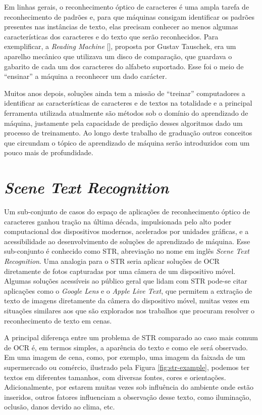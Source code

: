 Em linhas gerais, o reconhecimento óptico de caracteres é uma ampla tarefa de reconhecimento de padrões e, para que máquinas consigam identificar 
os padrões presentes nas instâncias de texto, elas precisam conhecer ao menos algumas características dos caracteres e do texto que serão 
reconhecidos. Para exemplificar, a \textit{Reading Machine} [], proposta por Gustav Tauschek, era um aparelho mecânico que utilizava um disco de 
comparação, que guardava o gabarito de cada um dos caracteres do alfabeto suportado. Esse foi o meio de “ensinar” a máquina a reconhecer um dado carácter.

Muitos anos depois, soluções ainda tem a missão de “treinar” computadores a identificar as características de caracteres e de textos na totalidade 
e a principal ferramenta utilizada atualmente são métodos sob o domínio do aprendizado de máquina, justamente pela capacidade de predição desses 
algoritmos dado um processo de treinamento. Ao longo deste trabalho de graduação outros conceitos que circundam o tópico de aprendizado de máquina 
serão introduzidos com um pouco mais de profundidade.

\section{\textit{Scene Text Recognition}}

Um sub-conjunto de casos do espaço de aplicações de reconhecimento óptico de caracteres ganhou tração na última década, impulsionada pelo 
alto poder computacional dos dispositivos modernos, acelerados por unidades gráficas, e a acessibilidade ao desenvolvimento de soluções de aprendizado 
de máquina. Esse sub-conjunto é conhecido como STR, abreviação no nome em inglês \textit{Scene Text Recognition}. Uma analogia para o STR seria aplicar 
soluções de OCR diretamente de fotos capturadas por uma câmera de um dispositivo móvel. Algumas soluções acessíveis ao público geral que lidam 
com STR pode-se citar aplicações como o \textit{Google Lens} e o \textit{Apple Live Text}, que permitem a extração de texto de imagens diretamente 
da câmera do dispositivo móvel, muitas vezes em situações similares aos que são explorados nos trabalhos que procuram resolver o reconhecimento 
de texto em cenas.
 
A principal diferença entre um problema de STR comparado ao caso mais comum de OCR é, em termos simples, a aparência do texto e como ele será observado. 
Em uma imagem de cena, como, por exemplo, uma imagem da faixada de um supermercado ou comércio, ilustrado pela Figura \ref{fig:str-example}, podemos 
ter textos em diferentes tamanhos, com diversas fontes, cores e orientações. Adicionalmente, por estarem muitas vezes sob influência do ambiente onde 
estão inseridos, outros fatores influenciam a observação desse texto, como iluminação, oclusão, danos devido ao clima, etc.

